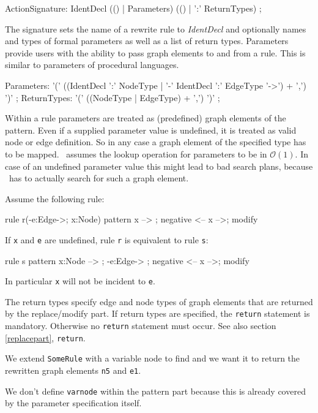 \begin{rail}  
  ActionSignature: IdentDecl (() | Parameters) (() | ':' ReturnTypes) ;
\end{rail}
The signature sets the name of a rewrite rule to \emph{IdentDecl} and optionally names and types of formal parameters as well as a list of return types. Parameters provide users with the ability to pass graph elements to and from a rule. This is similar to parameters of procedural languages.

\begin{rail}
  Parameters: '(' ((IdentDecl ':' NodeType | '-' IdentDecl ':' EdgeType '->') + ',') ')' ;
  ReturnTypes: '(' ((NodeType | EdgeType) + ',') ')' ;
\end{rail}
Within a rule parameters are treated as (predefined) graph elements of the pattern. Even if a supplied parameter value is undefined, it is treated as valid node or edge definition. So in any case a graph element of the specified type has to be mapped. \GrG\ assumes the lookup operation for parameters to be in $\mathcal{O}(1)$. In case of an undefined parameter value this might lead to bad search plans, because \GrG\ has to actually search for such a graph element.
\begin{example}
Assume the following rule:
\begin{grgen}
rule r(-e:Edge->; x:Node) {
  pattern {
    x --> ;
    negative {
      <-- x -->;
    }
  }
  modify {}
}
\end{grgen}
If \texttt{x} and \texttt{e} are undefined, rule \texttt{r} is equivalent to rule \texttt{s}:
\begin{grgen}
rule s {
  pattern {
    x:Node --> ;
    -e:Edge-> ;
    negative {
      <-- x -->;
    }
  }
  modify {}
}
\end{grgen}
In particular \texttt{x} will not be incident to \texttt{e}.
\end{example}
The return types specify edge and node types of graph elements that are returned by the replace/modify part. If return types are specified, the \texttt{return} statement is mandatory. Otherwise no \texttt{return} statement must occur. See also section \ref{replacepart}, \texttt{return}.
\begin{example}
We extend \texttt{SomeRule} with a variable node to find and we want it to return the rewritten graph elements \texttt{n5} and \texttt{e1}.
\begin{grgen}
  rule SomeRuleExt(varnode: Node): (Node, EdgeTypeB) {
    pattern {
      n1: NodeTypeA;
      ...
    }
    replace {
      varnode;
      ...  
      return(n5, e1);
      eval {
        ...
\end{grgen}
We don't define \texttt{varnode} within the pattern part because this is already covered by the parameter specification itself.
\end{example}

